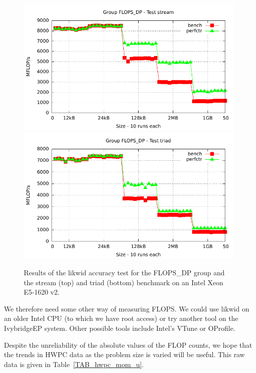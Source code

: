 \documentclass[12pt]{article}
\begin{document}
\begin{figure}
\centering
\includegraphics[width=120mm]{FLOPS_DP_stream_ivybridgeEP.pdf}
\includegraphics[width=120mm]{FLOPS_DP_triad_ivybridgeEP.pdf}
\caption{Results of the likwid accuracy test for the FLOPS\_DP group
  and the stream (top) and triad (bottom) benchmark on an Intel Xeon
  E5-1620 v2.}
\label{FIG_flops_dp_test}
\end{figure}

We therefore need some other way of measuring FLOPS. We could use
likwid on an older Intel CPU (to which we have root access) or try
another tool on the IvybridgeEP system. Other possible tools include
Intel's VTune or OProfile.

Despite the unreliability of the absolute values of the FLOP counts,
we hope that the trends in HWPC data as the problem size is varied
will be useful. This raw data is given in Table~\ref{TAB_hwpc_mom_u}.
\end{document}
